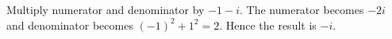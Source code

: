 Multiply numerator and denominator by $-1-i $. The numerator becomes $-2i $ and denominator becomes $(-1)^2+1^2=2 $. Hence the result is $\boxed{-i}$.
